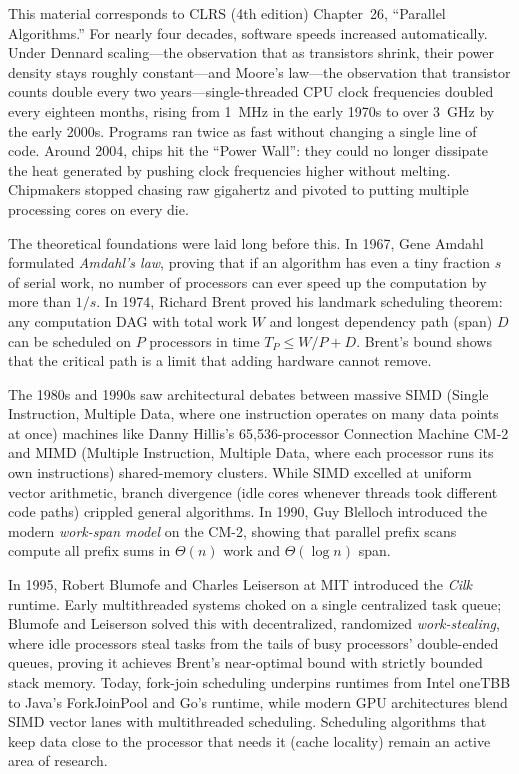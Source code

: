 \begin{historybox}
This material corresponds to CLRS (4th edition) Chapter~26, ``Parallel Algorithms.''
For nearly four decades, software speeds increased automatically. Under Dennard scaling---the
observation that as transistors shrink, their power density stays roughly constant---and
Moore's law---the observation that transistor counts double every two years---single-threaded
CPU clock frequencies doubled every eighteen months, rising from 1~MHz in the early
1970s to over 3~GHz by the early 2000s. Programs ran twice as fast without changing a
single line of code. Around 2004, chips hit the ``Power Wall'': they could no
longer dissipate the heat generated by pushing clock frequencies higher without
melting. Chipmakers stopped chasing raw gigahertz and pivoted to putting
multiple processing cores on every die.

The theoretical foundations were laid long before this. In 1967, Gene Amdahl formulated \emph{Amdahl's law}, proving that if an
algorithm has even a tiny fraction $s$ of serial work, no number of processors
can ever speed up the computation by more than $1/s$. In 1974, Richard Brent
proved his landmark scheduling theorem: any computation DAG with total work $W$
and longest dependency path (span) $D$ can be scheduled on $P$ processors in time
$T_P \le W/P + D$. Brent's bound shows that the critical path is a limit
that adding hardware cannot remove.

The 1980s and 1990s saw architectural debates between massive SIMD
(Single Instruction, Multiple Data, where one instruction operates on many data points at once) machines like Danny Hillis's 65,536-processor
Connection Machine CM-2 and MIMD (Multiple Instruction, Multiple Data, where each processor runs its own instructions) shared-memory
clusters. While SIMD excelled at uniform vector arithmetic, branch divergence
(idle cores whenever threads took different code paths) crippled general algorithms.
In 1990, Guy Blelloch introduced the modern \emph{work-span model} on the CM-2,
showing that parallel prefix scans compute all prefix sums in $\Theta(n)$ work and
$\Theta(\log n)$ span.

In 1995, Robert Blumofe and Charles Leiserson at MIT introduced
the \emph{Cilk} runtime. Early multithreaded systems choked on a single centralized
task queue; Blumofe and Leiserson solved this with decentralized, randomized
\emph{work-stealing}, where idle processors steal tasks from the tails of busy
processors' double-ended queues, proving it achieves Brent's
near-optimal bound with strictly bounded stack memory. Today, fork-join scheduling
underpins runtimes from Intel oneTBB to Java's ForkJoinPool and Go's runtime,
while modern GPU architectures blend SIMD vector lanes with multithreaded scheduling.
Scheduling algorithms that keep data close to the processor that needs it (cache locality) remain an active area of research.
\end{historybox}

